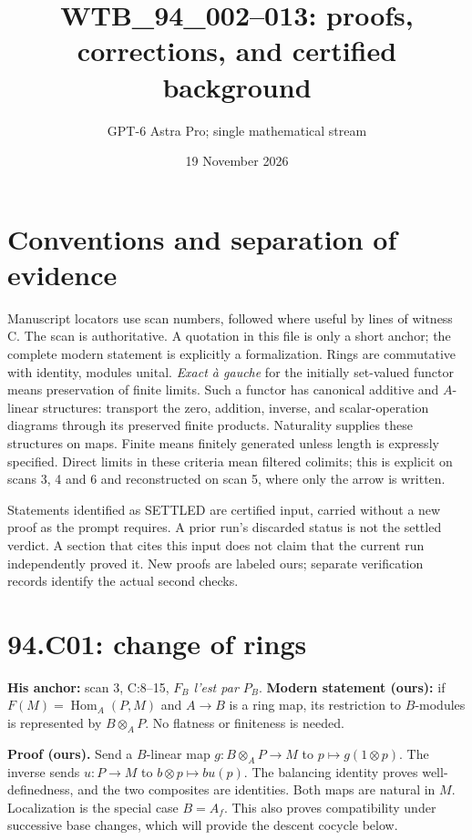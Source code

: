 \documentclass[11pt]{article}
\title{WTB\_94\_002--013: proofs, corrections, and certified background}
\author{GPT-6 Astra Pro; single mathematical stream}
\date{19 November 2026}
\newcommand{\Hom}{\operatorname{Hom}}
\begin{document}
\maketitle

\section*{Conventions and separation of evidence}
Manuscript locators use scan numbers, followed where useful by lines of witness C.
The scan is authoritative. A quotation in this file is only a short anchor;
the complete modern statement is explicitly a formalization.
Rings are commutative with identity, modules unital. \emph{Exact à gauche}
for the initially set-valued functor means preservation of finite limits.
Such a functor has canonical additive and $A$-linear structures: transport
the zero, addition, inverse, and scalar-operation diagrams through its
preserved finite products. Naturality supplies these structures on maps.
Finite means finitely generated unless length is expressly specified.
Direct limits in these criteria mean filtered colimits; this is explicit on
scans 3, 4 and 6 and reconstructed on scan 5, where only the arrow is written.

Statements identified as SETTLED are certified input, carried without a new
proof as the prompt requires. A prior run's discarded status is not the
settled verdict. A section that cites this input does not claim that the
current run independently proved it. New proofs are labeled ours; separate
verification records identify the actual second checks.

\section{94.C01: change of rings}
\label{C01}
\textbf{His anchor:} scan 3, C:8--15, \emph{$F_B$ l'est par $P_B$}.
\textbf{Modern statement (ours):} if $F(M)=\Hom_A(P,M)$ and $A\to B$
is a ring map, its restriction to $B$-modules is represented by $B\otimes_A P$.
No flatness or finiteness is needed.

\textbf{Proof (ours).}
Send a $B$-linear map $g:B\otimes_A P\to M$ to $p\mapsto g(1\otimes p)$.
The inverse sends $u:P\to M$ to $b\otimes p\mapsto bu(p)$.
The balancing identity proves well-definedness, and the two composites
are identities. Both maps are natural in $M$. Localization is the
special case $B=A_f$. This also proves compatibility under successive
base changes, which will provide the descent cocycle below.
\end{document}
